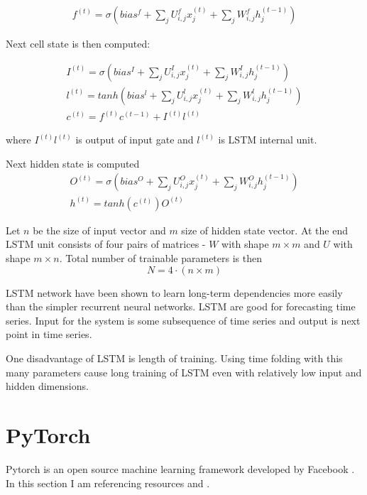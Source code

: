 \begin{eqnarray}
    f^{(t)} = \sigma \left(  bias^f + \sum_j U^f_{i,j} x^{(t)}_j + \sum_j W^f_{i,j} h^{(t-1)}_j \right)
\end{eqnarray}

Next cell state is then computed:


\begin{eqnarray}
    I^{(t)} = \sigma \left(  bias^I + \sum_j U^I_{i,j} x^{(t)}_j + \sum_j W^I_{i,j} h^{(t-1)}_j \right) \\
    l^{(t)} = tanh \left(  bias^l + \sum_j U^l_{i,j} x^{(t)}_j + \sum_j W^l_{i,j} h^{(t-1)}_j \right) \\
    c^{(t)} = f^{(t)}c^{(t-1)} + I^{(t)}l^{(t)}
\end{eqnarray}

where $I^{(t)}l^{(t)}$ is output of input gate and $l^{(t)}$ is LSTM internal unit.

Next hidden state is computed 
\begin{eqnarray}
    O^{(t)} = \sigma \left(  bias^O + \sum_j U^O_{i,j} x^{(t)}_j + \sum_j W^O_{i,j} h^{(t-1)}_j \right) \\
    h^{(t)} = tanh(c^{(t)}) O^{(t)}
\end{eqnarray}

Let $n$ be the size of input vector and $m$ size of hidden state vector. At the end LSTM unit consists of four pairs of matrices - $W$ with shape $m \times m$ and $U$ with shape $m \times n$. Total number of trainable parameters is then 
\begin{equation}
N = 4 \cdot ( n \times m ) 
\end{equation}

LSTM network have been shown to learn long-term dependencies more easily than the simpler recurrent neural networks. LSTM are good for forecasting time series. Input for the system is some subsequence of time series and output is next point in time series.  

One disadvantage of LSTM is length of training. Using time folding with this many parameters cause long training of LSTM even with relatively low input and hidden dimensions.

\section{PyTorch}

Pytorch is an open source machine learning framework developed by Facebook \cite{PytotchDocumentation}. In this section I am referencing resources \cite{Pytorch} and \cite{PytotchDocumentation}. 

